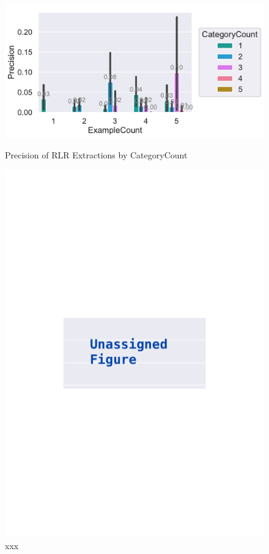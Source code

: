 \documentclass[\myrootdir/main.tex]{subfiles}
\begin{document}
\begin{figure}[htbp]
	\centering
	\begin{minipage}{0.45\textwidth}
		\centering
		\includegraphics[width=\textwidth, clip]{img/big-study/precision-categorycount-examplecount-rn.pdf}
		\caption{Precision of RLR Extractions by CategoryCount}
		\label{fig:precision-categorycount-examplecount-rn}
	\end{minipage}\hfill
	\begin{minipage}{0.45\textwidth}
		\centering
		\includegraphics[width=\textwidth, clip]{img/big-study/xxx.pdf}
		\caption{xxx}
		\label{fig:xxx}
	\end{minipage}
\end{figure}
\end{document}
